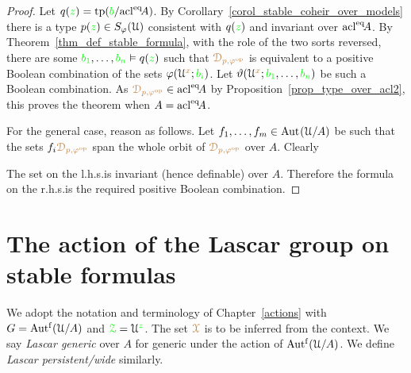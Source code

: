 \begin{proof}
  Let $q({\color{green} z})={\rm tp}({\color{green} b}/{\rm acl}^{{\rm eq}}\!A)$.
  By Corollary~\ref{corol_stable_coheir_over_models} there is a type $p({\color{green} z})\in S_\varphi(\EuScript U)$ consistent with $q({\color{green} z})$ and invariant over ${\rm acl}^{{\rm eq}}\!A$.
  By Theorem~\ref{thm_def_stable_formula}, with the role of the two sorts reversed, there are some ${\color{green} b_1},\dots,{\color{green} b_n}\vDash q({\color{green} z})$ such that ${\color{brown}\EuScript D_{p,\varphi^{\rm op}}}$ is equivalent to a positive Boolean combination of the sets $\varphi(\EuScript U^{\color{brown} x};{\color{green} b_i})$.
  Let $\vartheta(\EuScript U^{\color{brown} x};{\color{green} b_1},\dots,{\color{green} b_n})$ be such a Boolean combination.
  As ${\color{brown}\EuScript D_{p,\varphi^{\rm op}}}\in{\rm acl}^{{\rm eq}}\!A$ by Proposition~\ref{prop_type_over_acl2}, this proves the theorem when $A={\rm acl}^{{\rm eq}}\!A$.

  For the general case, reason as follows.
  Let $f_1,\dots,f_m\in{\rm Aut\kern.15ex}(\EuScript U/A)$ be such that the sets $f_i{\color{brown}\EuScript D_{p,\varphi^{\rm op}}}$ span the whole orbit of ${\color{brown}\EuScript D_{p,\varphi^{\rm op}}}$ over $A$.
  Clearly


  The set on the l.h.s.\@ is invariant (hence definable) over $A$.
  Therefore the formula on the r.h.s.\@ is the required positive Boolean combination.
\end{proof}

\section{The action of the Lascar group on stable formulas}\label{Lascar_action}

\def\medrel#1{\parbox[t]{6ex}{$\displaystyle\hfil #1$}}
\def\ceq#1#2#3{\parbox{10ex}{$\displaystyle #1$}\medrel{#2}$\displaystyle  #3$}

We adopt the notation and terminology of Chapter~\ref{actions} with $G=\mbox{Aut$^{\rm f}$}(\EuScript U/A)$ and ${\color{green}\EuScript Z}=\EuScript U^{\color{green} z}$.
The set ${\color{brown}\EuScript X}$ is to be inferred from the context.
We say \emph{Lascar generic\/} over $A$ for generic under the action of $\mbox{Aut$^{\rm f}$}(\EuScript U/A)$.
We define \emph{Lascar persistent/wide\/} similarly.

